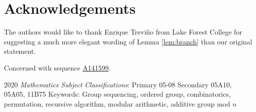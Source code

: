 \documentclass[12pt]{article}
\theoremstyle{plain}
\theoremstyle{definition}
\theoremstyle{remark}
\newcommand{\seqnum}[1]{\href{https://oeis.org/#1}{\textrm \underline{#1}}}
\begin{document}
\section*{Acknowledgements}
The authors would like to thank Enrique Trevi\~{n}o from Lake Forest College for suggesting a much more elegant wording of Lemma \ref{lem:branch} than our original statement. 

Concerned with sequence \seqnum{A141599}.

2020 \textit{Mathematics Subject Classifications}: 
Primary 05-08 Secondary 05A10, 05A05, 11B75
Keywords: Group sequencing, ordered group, combinatorics, permutation, recursive algorithm, modular arithmetic, additive group mod $n$ 
\end{document}
